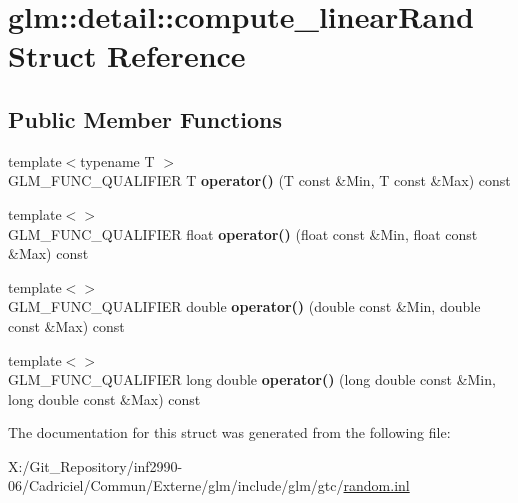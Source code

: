 \hypertarget{structglm_1_1detail_1_1compute__linear_rand}{\section{glm\-:\-:detail\-:\-:compute\-\_\-linear\-Rand Struct Reference}
\label{structglm_1_1detail_1_1compute__linear_rand}
}
\subsection*{Public Member Functions}
\begin{DoxyCompactItemize}
\item 
\hypertarget{structglm_1_1detail_1_1compute__linear_rand_ac852e16d66ba80ff5309238b3f494b99}{{\footnotesize template$<$typename T $>$ }\\G\-L\-M\-\_\-\-F\-U\-N\-C\-\_\-\-Q\-U\-A\-L\-I\-F\-I\-E\-R T {\bfseries operator()} (T const \&Min, T const \&Max) const }\label{structglm_1_1detail_1_1compute__linear_rand_ac852e16d66ba80ff5309238b3f494b99}

\item 
\hypertarget{structglm_1_1detail_1_1compute__linear_rand_aeb6d4f603a9afa05544d65233064f2e9}{{\footnotesize template$<$$>$ }\\G\-L\-M\-\_\-\-F\-U\-N\-C\-\_\-\-Q\-U\-A\-L\-I\-F\-I\-E\-R float {\bfseries operator()} (float const \&Min, float const \&Max) const }\label{structglm_1_1detail_1_1compute__linear_rand_aeb6d4f603a9afa05544d65233064f2e9}

\item 
\hypertarget{structglm_1_1detail_1_1compute__linear_rand_a60dd37b36082f1a8dbfb8d34f0d5575c}{{\footnotesize template$<$$>$ }\\G\-L\-M\-\_\-\-F\-U\-N\-C\-\_\-\-Q\-U\-A\-L\-I\-F\-I\-E\-R double {\bfseries operator()} (double const \&Min, double const \&Max) const }\label{structglm_1_1detail_1_1compute__linear_rand_a60dd37b36082f1a8dbfb8d34f0d5575c}

\item 
\hypertarget{structglm_1_1detail_1_1compute__linear_rand_ab5433863c50ed60a1ce5ac941759428f}{{\footnotesize template$<$$>$ }\\G\-L\-M\-\_\-\-F\-U\-N\-C\-\_\-\-Q\-U\-A\-L\-I\-F\-I\-E\-R long double {\bfseries operator()} (long double const \&Min, long double const \&Max) const }\label{structglm_1_1detail_1_1compute__linear_rand_ab5433863c50ed60a1ce5ac941759428f}

\end{DoxyCompactItemize}


The documentation for this struct was generated from the following file\-:\begin{DoxyCompactItemize}
\item 
X\-:/\-Git\-\_\-\-Repository/inf2990-\/06/\-Cadriciel/\-Commun/\-Externe/glm/include/glm/gtc/\hyperlink{random_8inl}{random.\-inl}\end{DoxyCompactItemize}
